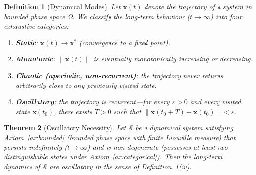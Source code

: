 \documentclass[11pt,twocolumn,a4paper]{article}
\newtheorem{theorem}{Theorem}[section]
\newtheorem{definition}[theorem]{Definition}
\begin{document}
\begin{definition}[Dynamical Modes]
\label{def:modes}
Let $\mathbf{x}(t)$ denote the trajectory of a system in bounded phase
space $\Omega$. We classify the long-term behaviour ($t \to \infty$)
into four exhaustive categories:
\begin{enumerate}[label=(\roman*),nosep]
  \item \textbf{Static}: $\mathbf{x}(t) \to \mathbf{x}^*$ (convergence
    to a fixed point).
  \item \textbf{Monotonic}: $\|\mathbf{x}(t)\|$ is eventually
    monotonically increasing or decreasing.
  \item \textbf{Chaotic (aperiodic, non-recurrent)}: the trajectory
    never returns arbitrarily close to any previously visited state.
  \item \textbf{Oscillatory}: the trajectory is recurrent---for every
    $\varepsilon > 0$ and every visited state $\mathbf{x}(t_0)$, there
    exists $T > 0$ such that
    $\|\mathbf{x}(t_0 + T) - \mathbf{x}(t_0)\| < \varepsilon$.
\end{enumerate}
\end{definition}

\begin{theorem}[Oscillatory Necessity]
\label{thm:oscillatory_necessity}
Let $\mathcal{S}$ be a dynamical system satisfying
Axiom~\ref{ax:bounded} (bounded phase space with finite Liouville
measure) that persists indefinitely ($t \to \infty$) and is
non-degenerate (possesses at least two distinguishable states under
Axiom~\ref{ax:categorical}). Then the long-term dynamics of
$\mathcal{S}$ are oscillatory in the sense of
Definition~\ref{def:modes}(iv).
\end{theorem}
\end{document}
